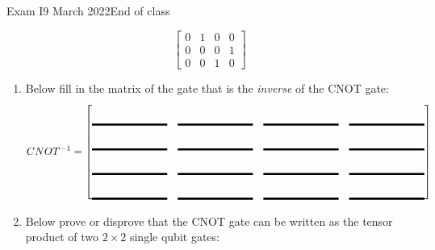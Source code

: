 \documentclass[12pt]{article}
\newcommand{\Blank}[1][1in]{\mbox{\vrule width #1 depth 2pt}\vrule width 0pt height 2.0em}
\begin{document}
\begin{assignment}{Exam I}{9 March 2022}{End of class}
\begin{enumerate}
\[\begin{bmatrix}
0 & 1 & 0 & 0 \\
0 & 0 & 0 & 1 \\
0 & 0 & 1 & 0
\end{bmatrix}
\]
\begin{enumerate}
  \item{} Below fill in the matrix of the gate that is the \emph{inverse} of
the CNOT gate:
\[
CNOT^{-1}=
\begin{bmatrix}
\Blank{} & \Blank{} & \Blank{} & \Blank{}  \\
\Blank{} & \Blank{} & \Blank{} & \Blank{}  \\
\Blank{} & \Blank{} & \Blank{} & \Blank{}  \\
\Blank{} & \Blank{} & \Blank{} & \Blank{} 
\end{bmatrix}
\]
 \item{} Below prove or disprove that the CNOT gate can be written as the
tensor product of two $2\times2$ single qubit gates:
\end{enumerate}

\end{enumerate}

\end{assignment}
\Bpage{}
\end{document}
